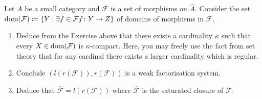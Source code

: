 \begin{Exercise}
    Let $ A $ be a small category and $ \mathcal{  F } $ is a set of morphisms on $ \widehat{ A } $. 
    Consider the set $ \operatorname{dom} ( \mathcal{ F } ) \coloneqq \{ Y \mid \exists f \in \mathcal{ F } f \colon Y \to Z \} $ of domains of morphisms in $\mathcal{F}$.

    \begin{enumerate}[label=(\alph*)]
        \item 
        Deduce from the Exercise above that there exists a cardinality $ \kappa $ such that every $ X \in \operatorname{dom} ( \mathcal{ F } ) $ is $ \kappa $-compact. 
        Here, you may freely use the fact from set theory that for any cardinal there exists a larger cardinality which is regular.

        \item
        Conclude $ ( l ( r ( \mathcal{ F } ) ), r ( \mathcal{ F } ) )$ is a weak factorisation system.

        \item 
        Deduce that $ \overline{ \mathcal{ F } } = l ( r ( \mathcal{ F } ) ) $ where $ \overline{ \mathcal{ F }}$ is the saturated closure of $ \mathcal{ F }$.
    \end{enumerate}
\end{Exercise}